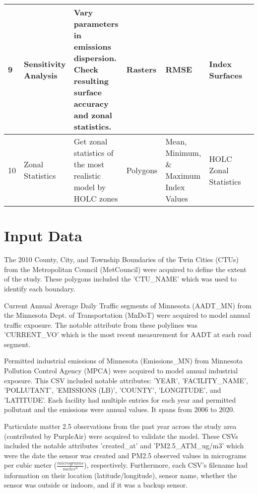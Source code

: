 \documentclass[article,12pt]{article}
\numberwithin{equation}{section}
\begin{document}
\begin{adjustwidth}{-.88in}{-.88in}
{\begin{tabular}{|l|p{.11\linewidth}|p{.17\linewidth}|p{.065\linewidth}|p{.125\linewidth}|p{.23\linewidth}|p{.15\linewidth}|}
		9 & Sensitivity Analysis & Vary parameters in emissions dispersion. Check resulting surface accuracy and zonal statistics.              &    Rasters                                     &  RMSE                                                  &   Index Surfaces                                                                                                                                                                                                      &           \\ \hline  
		10 & Zonal Statistics & Get zonal statistics of the most realistic model by HOLC zones & Polygons & Mean, Minimum, \& Maximum Index Values & HOLC Zonal Statistics & \\ \hline    
	\end{tabular}
	}
\end{adjustwidth}

\section{Input Data}

The 2010 County, City, and Township Boundaries of the Twin Cities (CTUs) from the Metropolitan Council (MetCouncil) were acquired to define the extent of the study. These polygons included the 'CTU\_NAME' which was used to identify each boundary.

Current Annual Average Daily Traffic segments of Minnesota (AADT\_MN) from the Minnesota Dept. of Transportation (MnDoT) were acquired to model annual traffic exposure. The notable attribute from these polylines was 'CURRENT\_VO' which is the most recent measurement for AADT at each road segment.

Permitted industrial emissions of Minnesota (Emissions\_MN) from Minnesota Pollution Control Agency (MPCA) were acquired to model annual industrial exposure. This CSV included notable attributes: 'YEAR', 'FACILITY\_NAME', 'POLLUTANT', 'EMISSIONS (LB)', 'COUNTY', 'LONGITUDE', and 'LATITUDE'. Each facility had multiple entries for each year and permitted pollutant and the emissions were annual values. It spans from 2006 to 2020.

Particulate matter 2.5 observations from the past year across the study area (contributed by PurpleAir) were acquired to validate the model. These CSVs included the notable attributes 'created\_at' and 'PM2.5\_ATM\_ug/m3' which were the date the sensor was created and PM2.5 observed values in micrograms per cubic meter ($\frac{micrograms}{meter^3}$), respectively. Furthermore, each CSV's filename had information on their location (latitude/longitude), sensor name, whether the sensor was outside or indoors, and if it was a backup sensor. 
\end{document}
